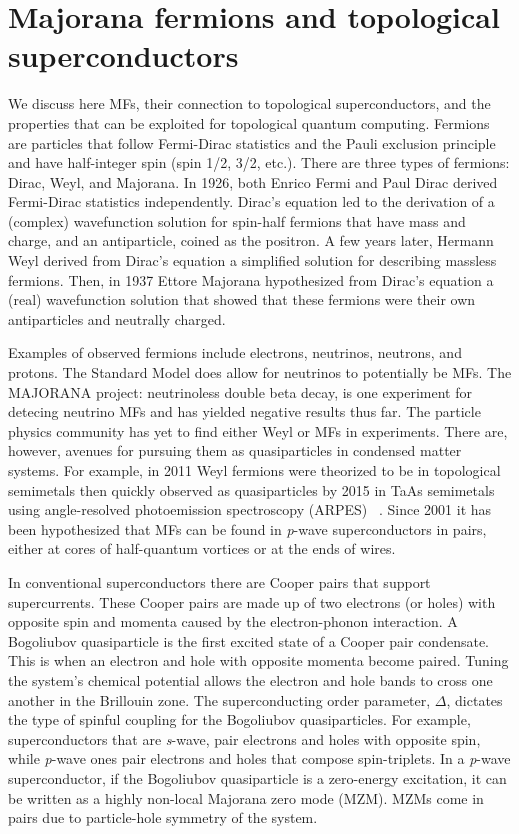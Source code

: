 \section{Majorana fermions and topological superconductors}

We discuss here MFs, their connection to topological superconductors, and the properties that can be exploited for topological quantum computing.
Fermions are particles that follow Fermi-Dirac statistics and the Pauli exclusion principle and have half-integer spin (spin 1/2, 3/2, etc.). There are three types of fermions: Dirac, Weyl, and Majorana. 
In 1926, both Enrico Fermi and Paul Dirac derived Fermi-Dirac statistics independently.
Dirac's equation led to the derivation of a (complex) wavefunction solution for spin-half fermions that have mass and charge, and an antiparticle, coined as the positron.
A few years later, Hermann Weyl derived from Dirac's equation a simplified solution for describing massless fermions.
Then, in 1937 Ettore Majorana hypothesized from Dirac's equation a (real) wavefunction solution that showed that these fermions were their own antiparticles and neutrally charged.

Examples of observed fermions include electrons, neutrinos, neutrons, and protons.
The Standard Model does allow for neutrinos to potentially be MFs.
The MAJORANA project: neutrinoless double beta decay, is one experiment for detecing neutrino MFs and has yielded negative results thus far.
The particle physics community has yet to find either Weyl or MFs in experiments.
There are, however, avenues for pursuing them as quasiparticles in condensed matter systems.
For example, in 2011 Weyl fermions were theorized to be in topological semimetals then quickly observed as quasiparticles by 2015 in TaAs semimetals using angle-resolved photoemission spectroscopy (ARPES)  ~\cite{wanTopologicalSemimetalFermiarc2011, xuDiscoveryWeylFermion2015, liWeylSemimetalTaAs2016}.
Since 2001 it has been hypothesized that MFs can be found in \textit{p}-wave superconductors in pairs, either at cores of half-quantum vortices or at the ends of wires.

In conventional superconductors there are Cooper pairs that support supercurrents.
These Cooper pairs are made up of two electrons (or holes) with opposite spin and momenta caused by the electron-phonon interaction.
A Bogoliubov quasiparticle is the first excited state of a Cooper pair condensate.
This is when an electron and hole with opposite momenta become paired.
Tuning the system's chemical potential allows the electron and hole bands to cross one another in the Brillouin zone.
The superconducting order parameter, $\Delta$, dictates the type of spinful coupling for the Bogoliubov quasiparticles.
For example, superconductors that are \textit{s}-wave, pair electrons and holes with opposite spin, while \textit{p}-wave ones pair electrons and holes that compose spin-triplets.
In a \textit{p}-wave superconductor, if the Bogoliubov quasiparticle is a zero-energy excitation, it can be written as a highly non-local Majorana zero mode (MZM).
MZMs come in pairs due to particle-hole symmetry of the system.

